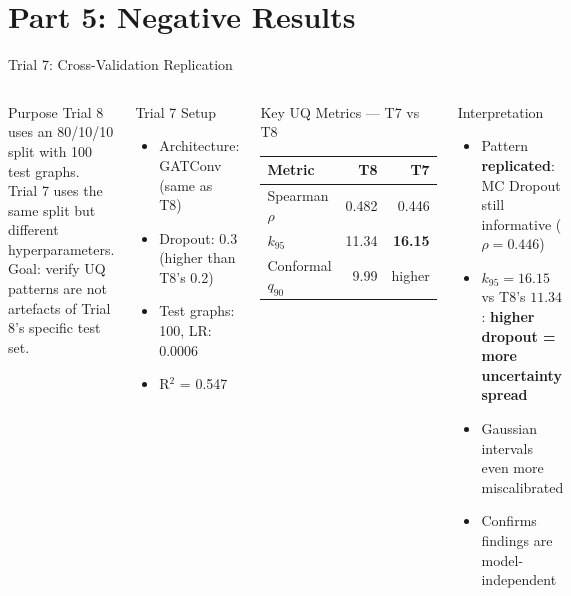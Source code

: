 \documentclass[aspectratio=169,10pt]{beamer}
\newcommand{\emphblue}[1]{\textcolor{tumblue}{\textbf{#1}}}
\newcommand{\emphred}[1]{\textcolor{tumred}{\textbf{#1}}}
\begin{document}
\section{Part 5: Negative Results}

\begin{frame}{Trial 7: Cross-Validation Replication}
  \begin{columns}[c]
      \begin{block}{Purpose}
        Trial 8 uses an 80/10/10 split with 100 test graphs.\\
        Trial 7 uses the same split but different hyperparameters.\\
        Goal: verify UQ patterns are not artefacts of Trial 8's specific test set.
      \end{block}
      \vspace{0.4em}
      \begin{block}{Trial 7 Setup}
        \begin{itemize}
          \item Architecture: GATConv (same as T8)
          \item Dropout: 0.3 (higher than T8's 0.2)
          \item Test graphs: 100, LR: 0.0006
          \item R$^2$ = 0.547
        \end{itemize}
      \end{block}
      \begin{alertblock}{Key UQ Metrics — T7 vs T8}
        \renewcommand{\arraystretch}{1.35}
        \begin{tabular}{lrr}
          \toprule
          \textbf{Metric} & \textbf{T8} & \textbf{T7} \\
          \midrule
          Spearman $\rho$ & 0.482 & 0.446 \\
          $k_{95}$ & 11.34 & \emphred{16.15} \\
          Conformal $q_{90}$ & 9.99 & higher \\
          \bottomrule
        \end{tabular}
      \end{alertblock}
      \vspace{0.3em}
      \begin{block}{Interpretation}
        \begin{itemize}
          \item Pattern \emphblue{replicated}: MC Dropout still informative ($\rho = 0.446$)
          \item $k_{95} = 16.15$ vs T8's $11.34$: \emphred{higher dropout = more uncertainty spread}
          \item Gaussian intervals even more miscalibrated
          \item Confirms findings are model-independent
        \end{itemize}
      \end{block}
  \end{columns}
\end{frame}
\end{document}
